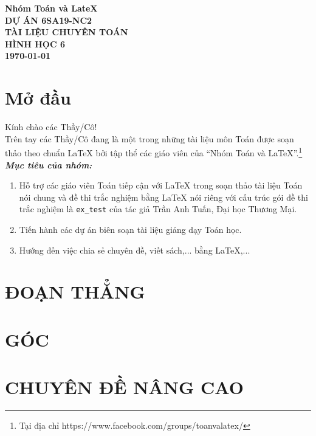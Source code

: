 \documentclass[12pt,a4paper]{extbook}
\theoremstyle{nonumberplain}
\begin{document}
	
\thispagestyle{empty}	
\begin{tcolorbox}[width=.99\textwidth,height=.99\textheight,arc = 2mm, arc is angular]
	\begin{center}
		{\LARGE \bf  Nhóm Toán và LateX}\\
		\vspace*{.4cm}
		{\large \bf  DỰ ÁN 6SA19-NC2}\\	
		\vspace*{9cm}	
		{\bf \color{blue} \fontsize{45}{0}\selectfont T\fontsize{25}{0}\selectfont ÀI LIỆU CHUYÊN TOÁN \\ HÌNH HỌC 6}\\
		\vspace*{12cm}
		{\large \bf \today}
	\end{center}		
\end{tcolorbox}

\pagestyle{plain}
\chead{\empty}
\lfoot{\empty}

\tableofcontents

\chapter*{Mở đầu}
Kính chào các Thầy/Cô! \\
Trên tay các Thầy/Cô đang là một trong những tài liệu môn Toán được soạn thảo theo chuẩn \LaTeX{} bởi tập thể các giáo viên của ``Nhóm Toán và LaTeX''.\footnote{Tại địa chỉ https://www.facebook.com/groups/toanvalatex/}\\
\textbf{\textit{Mục tiêu của nhóm:}} 
\begin{enumerate}[\bfseries 1.]
	\item Hỗ trợ các giáo viên Toán tiếp cận với \LaTeX{} trong soạn thảo tài liệu Toán nói chung và đề thi trắc nghiệm bằng \LaTeX{} nói riêng với cấu trúc gói đề thi trắc nghiệm là \texttt{ex\_test} của tác giả Trần Anh Tuấn, Đại học Thương Mại.
	\item Tiến hành các dự án biên soạn tài liệu giảng dạy Toán học.
	\item Hướng đến việc chia sẻ chuyên đề, viết sách,... bằng \LaTeX,...
\end{enumerate}

\chapter{ĐOẠN THẲNG}



\chapter{GÓC}




\chapter{CHUYÊN ĐỀ NÂNG CAO}


\end{document}
